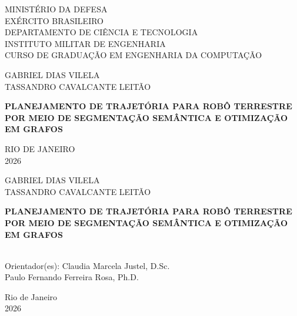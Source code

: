 \documentclass[
    12pt,
    openright,
    oneside,
    a4paper,
    english,
    brazil
]{abntex2}
\begin{document}
\frenchspacing

\pretextual

\begin{capa}
    \center
    \ABNTEXchapterfont

    {\normalsize
    MINISTÉRIO DA DEFESA\\
    EXÉRCITO BRASILEIRO\\
    DEPARTAMENTO DE CIÊNCIA E TECNOLOGIA\\
    INSTITUTO MILITAR DE ENGENHARIA\\
    CURSO DE GRADUAÇÃO EM ENGENHARIA DA COMPUTAÇÃO}

    \vspace*{2cm}

    {\large GABRIEL DIAS VILELA}\\
    {\large TASSANDRO CAVALCANTE LEITÃO}

    \vspace*{3cm}

    {\Large\bfseries PLANEJAMENTO DE TRAJETÓRIA PARA ROBÔ TERRESTRE POR MEIO DE SEGMENTAÇÃO SEMÂNTICA E OTIMIZAÇÃO EM GRAFOS}

    \vfill

    {\large RIO DE JANEIRO}\\
    {\large 2026}
\end{capa}

\begin{folhaderosto}
    \center
    {\large GABRIEL DIAS VILELA}\\
    {\large TASSANDRO CAVALCANTE LEITÃO}

    \vspace*{3cm}

    {\Large\bfseries PLANEJAMENTO DE TRAJETÓRIA PARA ROBÔ TERRESTRE POR MEIO DE SEGMENTAÇÃO SEMÂNTICA E OTIMIZAÇÃO EM GRAFOS}

    \vspace*{2cm}

    \hspace{.45\textwidth}
    \begin{minipage}{.5\textwidth}
        \imprimirpreambulo\\[1em]
        Orientador(es): Claudia Marcela Justel, D.Sc.\\
        Paulo Fernando Ferreira Rosa, Ph.D.
    \end{minipage}

    \vfill

    {\large Rio de Janeiro}\\
    {\large 2026}
\end{folhaderosto}
\end{document}
